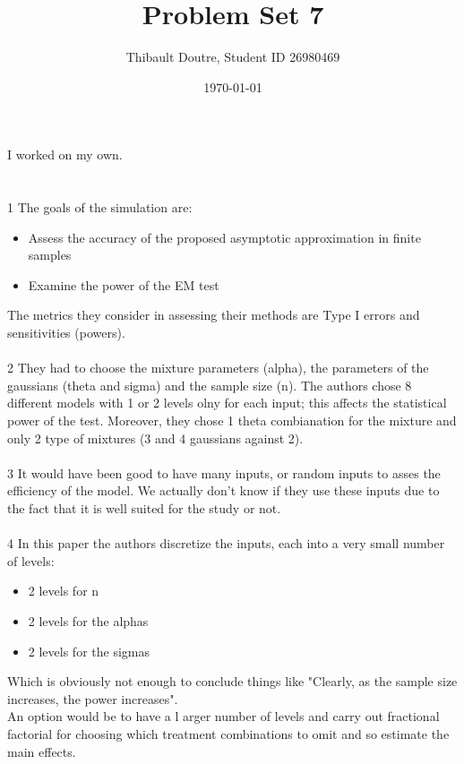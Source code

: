 \documentclass{llncs}\usepackage[]{graphicx}\usepackage[]{color}
\begin{document}
\title{Problem Set 7}
\author{Thibault Doutre, Student ID 26980469}
\date{\today}
\maketitle
\bigbreak
\noindent
I worked on my own.
\section{}
1
The goals of the simulation are:
\begin{itemize}
\item Assess the accuracy of the proposed asymptotic approximation in finite samples
\item Examine the power of the EM test
\end{itemize}
The metrics they consider in assessing their methods are Type I errors and sensitivities (powers).
\\\\
2
They had to choose the mixture parameters (alpha), the parameters of the gaussians (theta and sigma) and the sample size (n).
The authors chose 8 different models with 1 or 2 levels olny for each input; this affects the statistical power of the test. Moreover, they chose 1 theta combianation for the mixture and only 2 type of mixtures (3 and 4 gaussians against 2).
\\\\
3
It would have been good to have many inputs, or random inputs to asses the efficiency of the model. We actually don't know if they use these inputs due to the fact that it is well suited for the study or not.
\\\\
4
In this paper the authors discretize the inputs, each into a very small number of levels:
\begin{itemize}
\item 2 levels for n
\item 2 levels for the alphas
\item 2 levels for the sigmas
\end{itemize}
Which is obviously not enough to conclude things like "Clearly, as the sample size increases, the power increases".
\\
An option would be to have a l	arger number of levels and carry out fractional factorial for choosing which treatment combinations to omit and so estimate the main effects.
\end{document}
